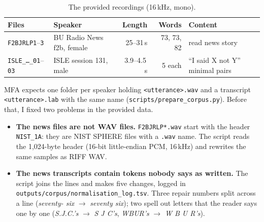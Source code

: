 \documentclass[11pt,a4paper]{article}
\newcommand{\code}[1]{\texttt{#1}}
\begin{document}
\begin{table}[H]\centering\small
\caption{The provided recordings (16\,kHz, mono).}
\label{tab:data}
\begin{tabularx}{\linewidth}{@{}llrr>{\raggedright\arraybackslash}X@{}}
\toprule
Files & Speaker & Length & Words & Content \\
\midrule
\code{F2BJRLP1}--\code{3} & BU Radio News f2b, female & 25--31\,s & 73, 73, 82 & read news story \\
\code{ISLE\_\ldots\_01}--\code{03} & ISLE session 131, male & 3.9--4.5\,s & 5 each &
``I said X not Y'' minimal pairs \\
\bottomrule
\end{tabularx}
\end{table}

MFA expects one folder per speaker holding \code{<utterance>.wav} and a transcript \code{<utterance>.lab} with the
same name (\code{scripts/prepare\_corpus.py}). Before that, I fixed two problems in the provided data.
\begin{itemize}
\item \textbf{The news files are not WAV files.} \code{F2BJRLP*.wav} start with the header \code{NIST\_1A}: they are
NIST SPHERE files with a \code{.wav} name. The script reads the 1,024-byte header (16-bit little-endian PCM,
16\,kHz) and rewrites the same samples as RIFF WAV.
\item \textbf{The news transcripts contain tokens nobody says as written.} The script joins the lines and makes
five changes, logged in \code{outputs/corpus/normalisation\_log.tsv}. Three repair numbers split across a line
(\emph{seventy- six} $\to$ \emph{seventy six}); two spell out letters that the reader says one by one
(\emph{S.J.C.'s} $\to$ \emph{S J C's}, \emph{WBUR's} $\to$ \emph{W B U R's}).
\end{itemize}
\end{document}
